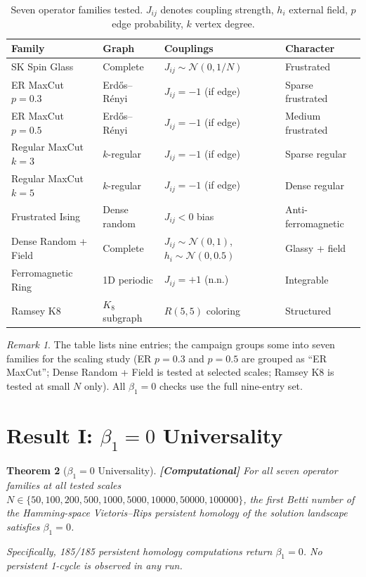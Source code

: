 \documentclass[12pt,a4paper]{article}
\newcommand{\computational}[1]{\textcolor{computational}{\textbf{[Computational]}} #1}
\newtheorem{theorem}{Theorem}[section]
\theoremstyle{definition}\newtheorem{definition}[theorem]{Definition}
\theoremstyle{remark}\newtheorem{remark}[theorem]{Remark}
\newcommand{\betaone}{\beta_1}
\begin{document}
\begin{table}[H]
\centering
\caption{Seven operator families tested. $J_{ij}$ denotes coupling strength,
$h_i$ external field, $p$ edge probability, $k$ vertex degree.}
\label{tab:families}
\begin{tabular}{@{}llll@{}}
\toprule
\textbf{Family} & \textbf{Graph} & \textbf{Couplings} & \textbf{Character} \\
\midrule
SK Spin Glass       & Complete       & $J_{ij} \sim \mathcal{N}(0,1/N)$ & Frustrated \\
ER MaxCut $p=0.3$   & Erd\H{o}s--R\'{e}nyi & $J_{ij} = -1$ (if edge) & Sparse frustrated \\
ER MaxCut $p=0.5$   & Erd\H{o}s--R\'{e}nyi & $J_{ij} = -1$ (if edge) & Medium frustrated \\
Regular MaxCut $k=3$ & $k$-regular   & $J_{ij} = -1$ (if edge) & Sparse regular \\
Regular MaxCut $k=5$ & $k$-regular   & $J_{ij} = -1$ (if edge) & Dense regular \\
Frustrated Ising    & Dense random   & $J_{ij} < 0$ bias      & Anti-ferromagnetic \\
Dense Random + Field & Complete       & $J_{ij} \sim \mathcal{N}(0,1)$, $h_i \sim \mathcal{N}(0,0.5)$ & Glassy + field \\
Ferromagnetic Ring  & 1D periodic    & $J_{ij} = +1$ (n.n.)   & Integrable \\
Ramsey K8           & $K_8$ subgraph & $R(5,5)$ coloring      & Structured \\
\bottomrule
\end{tabular}
\end{table}

\begin{remark}
The table lists nine entries; the campaign groups some into seven families
for the scaling study (ER $p=0.3$ and $p=0.5$ are grouped as ``ER MaxCut'';
Dense Random + Field is tested at selected scales; Ramsey K8 is tested at
small $N$ only). All $\betaone = 0$ checks use the full nine-entry set.
\end{remark}

\section{Result I: $\betaone = 0$ Universality}
\label{sec:beta1}

\begin{theorem}[$\betaone = 0$ Universality]
\label{thm:beta1}
\computational{For all seven operator families at all tested scales
$N \in \{50, 100, 200, 500, 1000, 5000, 10000, 50000, 100000\}$, the
first Betti number of the Hamming-space Vietoris--Rips persistent homology
of the solution landscape satisfies $\betaone = 0$.}

Specifically, 185/185 persistent homology computations return $\betaone = 0$.
No persistent 1-cycle is observed in any run.
\end{theorem}
\end{document}
